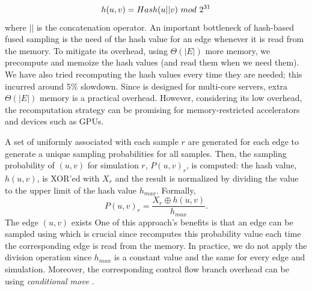\begin{equation}
    \label{eq:hash}
    h(u,v) = \mbox{{\sc Hash}}(u||v)~mod~2^{31}  
\end{equation} %
where $||$ is the concatenation operator. 
An  important bottleneck of hash-based fused sampling is the need of the hash value for an edge whenever it is read from the memory. To mitigate its overhead, using $\Theta(|E|)$ more memory, we precompute and memoize the hash values (and read them when we need them). We have also tried recomputing the hash values every time they are needed; this incurred around $5\%$ slowdown. Since {\acro} is designed for multi-core servers, extra $\Theta(|E|)$ memory is a practical overhead. However, considering its low overhead, the recomputation strategy can be promising for memory-restricted accelerators and devices such as GPUs.


A set of uniformly  associated with each sample $r$ are generated for each edge to generate a unique sampling probabilities for all samples. Then, the sampling probability of $(u, v)$ for simulation $r$, $P(u, v)_r$, is computed: the hash value, $h(u,v)$, is XOR'ed with  $X_r$ and the result is normalized by dividing the value to the upper limit of the hash value $h_{max}$. Formally,
\begin{equation}
    \label{eq:hash_prob}
    P(u,v)_r = \frac{X_r \oplus h(u,v)}{h_{max}}.
\end{equation}
The edge $(u,v)$ exists  One of this approach's benefits is that an edge can be sampled using  which is crucial since \acro{} recomputes this probability value each time the corresponding edge is read from the memory. In practice, we do not apply the division operation since $h_{max}$ is a constant value and the same for every edge and simulation. Moreover, the corresponding control flow branch overhead can be  using {\em conditional move} . 

